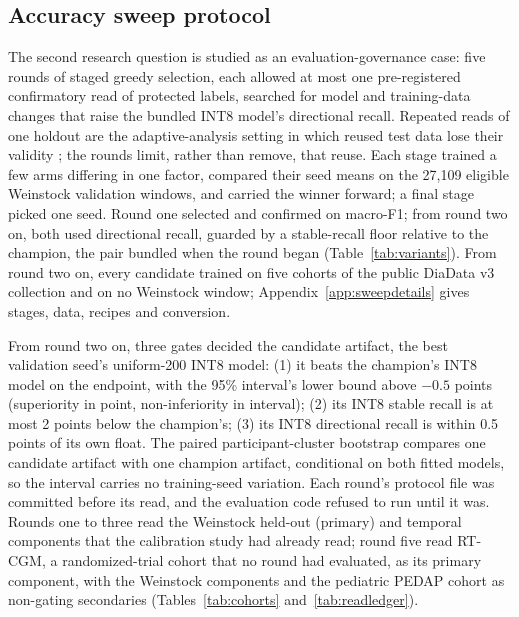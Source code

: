 \documentclass[10pt,twocolumn]{article}
\begin{document}
\subsection{Accuracy sweep protocol}
\label{sec:sweepprotocol}

The second research question is studied as an evaluation-governance case:
five rounds of staged greedy selection, each allowed at most one
pre-registered confirmatory read of protected labels, searched for model
and training-data changes that raise the bundled INT8 model's directional
recall. Repeated reads of one holdout are the adaptive-analysis setting
in which reused test data lose their validity
\cite{dwork2015reusable,blum2015ladder}; the rounds limit, rather than
remove, that reuse. Each stage trained a few arms differing in one factor,
compared their seed means on the 27,109 eligible Weinstock validation
windows, and carried the winner forward; a final stage picked one seed.
Round one selected and confirmed on macro-F1; from
round two on, both used directional recall, guarded by a stable-recall
floor relative to the champion, the pair bundled when the round began
(Table~\ref{tab:variants}). From round two on, every candidate trained on
five cohorts of the public DiaData v3 collection \cite{cinar2026diadata}
and on no Weinstock window; Appendix~\ref{app:sweepdetails} gives stages,
data, recipes and conversion.

From round two on, three gates decided the candidate artifact, the best
validation seed's uniform-200 INT8 model: (1) it beats the champion's INT8
model on the endpoint, with the 95\% interval's lower bound above $-0.5$
points (superiority in point, non-inferiority in interval); (2) its INT8
stable recall is at most 2 points below the champion's; (3) its INT8
directional recall is within 0.5 points of its own float. The paired
participant-cluster bootstrap compares one candidate artifact with one
champion artifact, conditional on both fitted models, so the interval
carries no training-seed variation. Each round's protocol file was
committed before its read, and the evaluation code refused to run until it
was. Rounds one to three read the Weinstock held-out (primary) and
temporal components that the calibration study had already read; round
five read RT-CGM, a randomized-trial cohort \cite{jdrf2008cgm} that no
round had evaluated, as its primary component, with the Weinstock
components and the pediatric PEDAP cohort \cite{wadwa2023pedap} as
non-gating secondaries (Tables~\ref{tab:cohorts} and~\ref{tab:readledger}).
\end{document}
